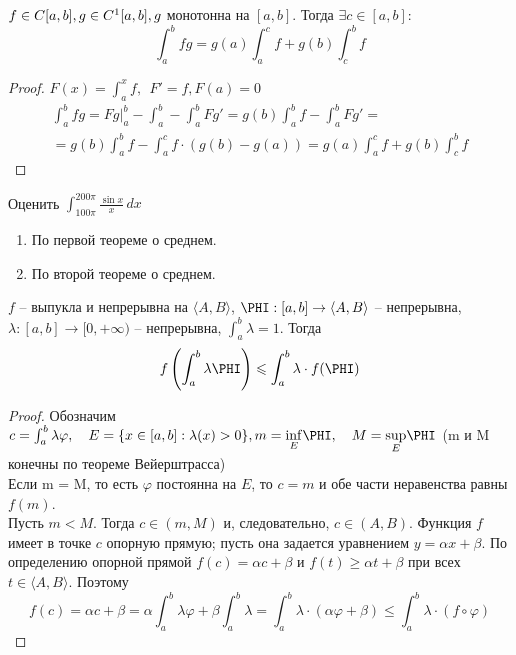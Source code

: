 \begin{Thm} 
	$f \in C[a,b], \\ g \in C^1[a,b], g$ монотонна на $[a,b].$ Тогда $\exists c \in [a,b]:$
	\[\int_{a}^{b} fg = g(a) \int_{a}^{c} f + g(b) \int_{c}^{b} f\]
\end{Thm} 

\begin{proof}
	$\displaystyle F(x) = \int_{a}^{x} f, \ \ F' = f, F(a) = 0$
	\begin{gather*}
		\int_{a}^{b} fg = Fg \Big|^b_a - \int_{a}^{b} - \int_{a}^{b} Fg' = g(b) \int_{a}^{b} f - \int_{a}^{b} Fg' = \\
		= g(b) \int_{a}^{b} f - \int_{a}^{c} f \cdot (g(b) - g(a)) = g(a) \int_{a}^{c} f + g(b) \int_{c}^{b} f
	\end{gather*}
\end{proof}

\begin{Ex}
	Оценить $\int_{100\pi}^{200\pi} \frac{\sin x}{x} \,dx$\\
	\begin{enumerate}
		\item По первой теореме о среднем.
		\item По второй теореме о среднем.
	\end{enumerate}
	
\end{Ex}


\def\AuthorName{Илья Дудников}

\begin{Thm}
	$f$ -- выпукла и непрерывна на $\langle A, B\rangle$, $\PHI : [a, b] \to \langle A, B\rangle$ -- непрерывна,
	$\lambda : [a, b] \to [0, +\infty)$ -- непрерывна, $\int_a^b \lambda = 1$. Тогда
	\[f\left( \int_a^b \lambda \PHI\right) \leqslant \int_a^b \lambda \cdot f(\PHI)\]
\end{Thm}

\begin{proof}
	Обозначим $c = \int_{a}^{b} \lambda \varphi, \ \ \ E = \{x \in [a,b]: \lambda (x) > 0\},\\
	m = \underset{E}{\inf} \PHI, \ \ \ M = \underset{E}{\sup} \PHI$ (m и M конечны по теореме Вейерштрасса)\\
	Если m = M, то есть $\varphi$ постоянна на $E$, то $c = m$ и обе части неравенства равны $f(m)$.\\
	Пусть $m < M$. Тогда $c \in (m, M)$ и, следовательно, $c \in (A, B)$. Функция $f$ имеет в точке $c$ опорную прямую;
	пусть она задается уравнением $y = \alpha x + \beta$. По определению опорной прямой $f(c) = \alpha c + \beta$ и $f(t) \geqslant \alpha t + \beta$ при всех $t \in \langle A, B \rangle$. Поэтому
	$$f(c) = \alpha c + \beta = \alpha \int_{a}^{b} \lambda \varphi + \beta \int_{a}^{b} \lambda = \int_{a}^{b} \lambda \cdot (\alpha \varphi + \beta) \leqslant \int_{a}^{b} \lambda \cdot (f \circ \varphi)$$
\end{proof}

